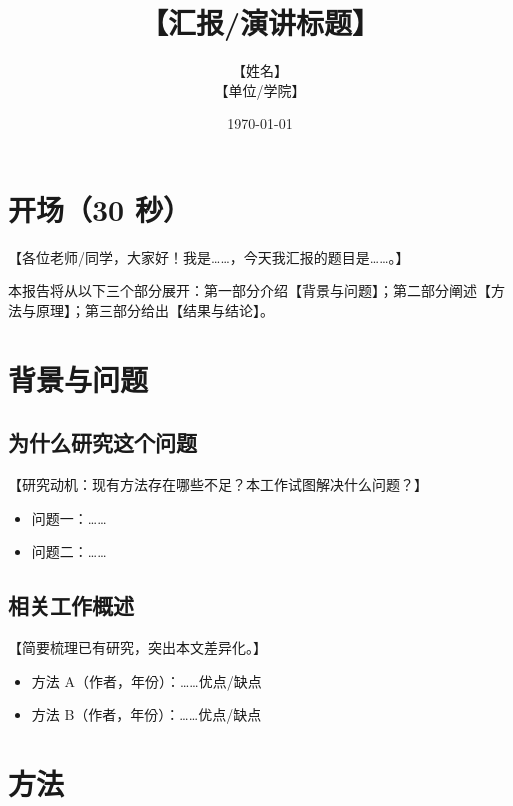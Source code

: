 \documentclass[12pt,a4paper]{article}
\title{\textbf{【汇报/演讲标题】}}
\author{【姓名】 \\ \small 【单位/学院】}
\date{\today}
\begin{document}
\maketitle
\vspace{-1.2cm}

\section*{开场（30 秒）}
【各位老师/同学，大家好！我是……，今天我汇报的题目是……。】

本报告将从以下三个部分展开：第一部分介绍【背景与问题】；第二部分阐述【方法与原理】；第三部分给出【结果与结论】。

\section{背景与问题}
\subsection{为什么研究这个问题}
【研究动机：现有方法存在哪些不足？本工作试图解决什么问题？】
\begin{itemize}
    \item 问题一：……
    \item 问题二：……
\end{itemize}

\subsection{相关工作概述}
【简要梳理已有研究，突出本文差异化。】
\begin{itemize}
    \item 方法 A（作者，年份）：……优点/缺点
    \item 方法 B（作者，年份）：……优点/缺点
\end{itemize}

\section{方法}
\end{document}

